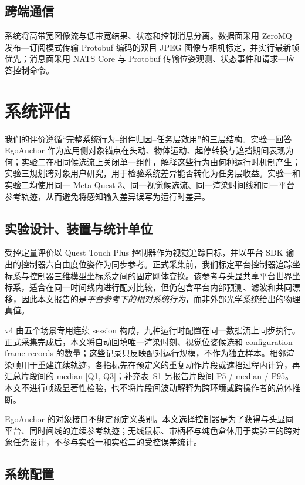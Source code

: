 \documentclass[review]{vgtc}
\begin{document}
\subsection{跨端通信}


系统将高带宽图像流与低带宽结果、状态和控制消息分离。数据面采用 ZeroMQ 发布---订阅模式传输 Protobuf 编码的双目 JPEG 图像与相机标定，并实行最新帧优先；消息面采用 NATS Core 与 Protobuf 传输位姿观测、状态事件和请求---应答控制命令。

\section{系统评估}\label{sec:eval}

我们的评价遵循“完整系统行为--组件归因--任务层效用”的三层结构。实验一回答 EgoAnchor 作为应用侧对象锚点在头动、物体运动、起停转换与遮挡期间表现为何；实验二在相同候选流上关闭单一组件，解释这些行为由何种运行时机制产生；实验三规划跨对象用户研究，用于检验系统差异能否转化为任务层收益。实验一和实验二均使用同一 Meta Quest 3、同一视觉候选流、同一渲染时间线和同一平台参考轨迹，从而避免将感知输入差异误写为运行时差异。

\subsection{实验设计、装置与统计单位}

受控定量评价以 Quest Touch Plus 控制器作为视觉追踪目标，并以平台 SDK 输出的控制器六自由度位姿作为同步参考。正式采集前，我们标定平台控制器追踪坐标系与控制器三维模型坐标系之间的固定刚体变换。该参考与头显共享平台世界坐标系，适合在同一时间线内进行配对比较，但仍包含平台内部预测、滤波和共同漂移，因此本文报告的是\emph{平台参考下的相对系统行为}，而非外部光学系统给出的物理真值。

v4 由五个场景专用连续 session 构成，九种运行时配置在同一数据流上同步执行。正式采集完成后，本文将自动回填唯一渲染时刻、视觉位姿候选和 configuration--frame records 的数量；这些记录只反映配对运行规模，不作为独立样本。相邻渲染帧用于重建连续轨迹，各指标先在预定义的重复动作片段或遮挡过程内计算，再汇总片段间的 median [Q1, Q3]；补充表~S1 另报告片段间 P5 / median / P95。本文不进行帧级显著性检验，也不将片段间波动解释为跨环境或跨操作者的总体推断。

EgoAnchor 的对象接口不绑定预定义类别。本文选择控制器是为了获得与头显同平台、同时间线的连续参考轨迹；无线鼠标、带柄杯与纯色盒体用于实验三的跨对象任务设计，不参与实验一和实验二的受控误差统计。

\subsection{系统配置}
\end{document}
